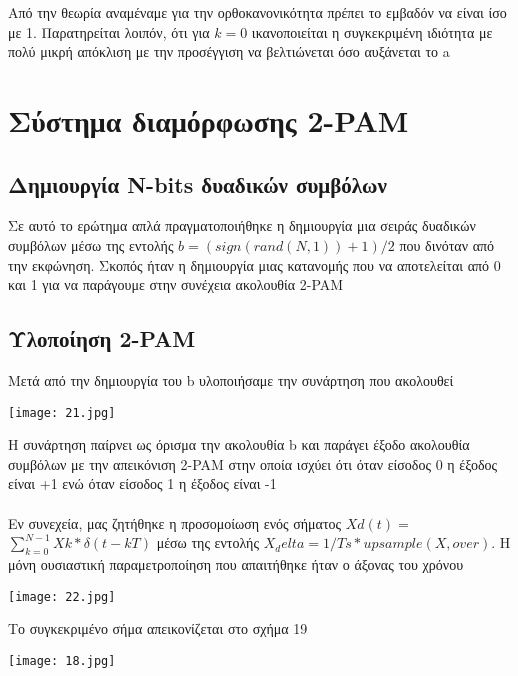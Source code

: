 \documentclass[11pt]{article}
\begin{document}
Από την θεωρία αναμέναμε για την ορθοκανονικότητα πρέπει το εμβαδόν να είναι ίσο με 1. Παρατηρείται λοιπόν, ότι για $k=0$ ικανοποιείται η συγκεκριμένη ιδιότητα με πολύ μικρή απόκλιση με την προσέγγιση να βελτιώνεται όσο αυξάνεται το a
\section{Σύστημα διαμόρφωσης \foreignlanguage{english}{2-PAM}}

\subsection{Δημιουργία \foreignlanguage{english}{N-bits} δυαδικών συμβόλων }

Σε αυτό το ερώτημα απλά πραγματοποιήθηκε η δημιουργία μια σειράς δυαδικών συμβόλων μέσω της εντολής $b = (sign(rand(N,1))+1)/2$ που δινόταν από την εκφώνηση. Σκοπός ήταν η δημιουργία μιας κατανομής που να αποτελείται από 0 και 1 για να παράγουμε στην συνέχεια ακολουθία \foreignlanguage{english}{2-PAM}
\subsection{Υλοποίηση \foreignlanguage{english}{2-PAM}}

Μετά από την δημιουργία του \foreignlanguage{english}{b} υλοποιήσαμε την συνάρτηση που ακολουθεί

\texttt{[image: 21.jpg]}

Η συνάρτηση παίρνει ως όρισμα την ακολουθία \foreignlanguage{english}{b} και παράγει έξοδο ακολουθία συμβόλων με την απεικόνιση \foreignlanguage{english}{2-PAM} στην οποία ισχύει ότι όταν είσοδος 0 η έξοδος είναι +1 ενώ όταν είσοδος 1 η έξοδος είναι -1

\paragraph{}
Εν συνεχεία, μας ζητήθηκε η προσομοίωση ενός σήματος $Xd(t)=$ $\sum_{k=0}^{N-1} Xk*δ(t-kT)$ μέσω της εντολής $X_delta = 1/Ts*upsample(X,over)$. Η μόνη ουσιαστική παραμετροποίηση που απαιτήθηκε ήταν ο άξονας του χρόνου 

\texttt{[image: 22.jpg]}

Το συγκεκριμένο σήμα απεικονίζεται στο σχήμα 19 

\texttt{[image: 18.jpg]}
\end{document}
